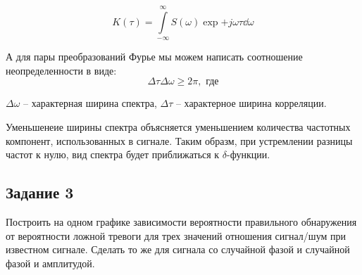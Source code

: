 \begin{equation}
    K(\tau) = \int\limits_{-\infty}^{\infty} S(\omega) \exp{+j\omega\tau} \dd{\omega}
\end{equation}

А для пары преобразований Фурье мы можем написать соотношение неопределенности
в виде:
\begin{equation}
    \Delta \tau  \Delta \omega \geq 2\pi, \text{ где}
\end{equation} 

$\Delta \omega$ -- характерная ширина спектра, $\Delta \tau$ -- характерное ширина корреляции.

Уменьшенеие ширины спектра объясняется уменьшением количества частотных компонент, использованных 
в сигнале. Таким образм, при устремлении разницы частот к нулю, вид спектра будет приближаться к $\delta$-функции.


\subsection{Задание 3}
Построить на одном графике зависимости вероятности правильного
обнаружения от вероятности ложной тревоги для трех значений
отношения сигнал/шум при известном сигнале. Сделать то же для сигнала
со случайной фазой и случайной фазой и амплитудой. 

